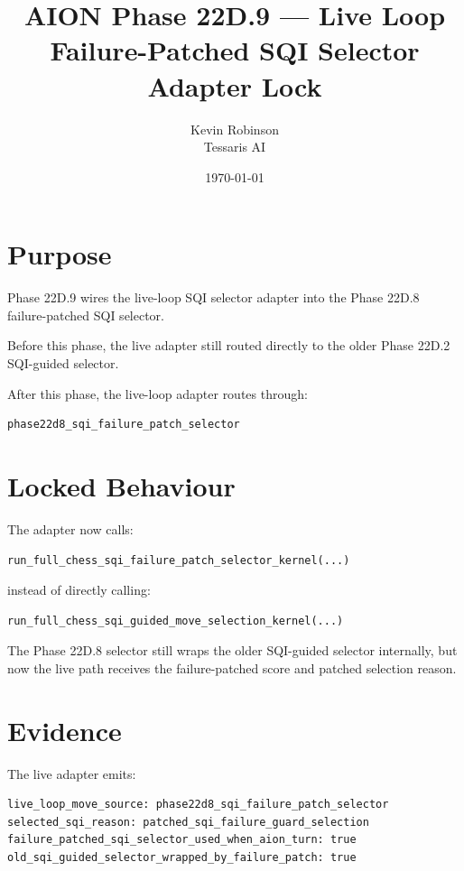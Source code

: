 \documentclass[11pt,a4paper]{article}
\title{\textbf{AION Phase 22D.9 --- Live Loop Failure-Patched SQI Selector Adapter Lock}}
\author{Kevin Robinson\\Tessaris AI}
\date{\today}
\begin{document}
\maketitle

\section{Purpose}

Phase 22D.9 wires the live-loop SQI selector adapter into the Phase 22D.8 failure-patched SQI selector.

Before this phase, the live adapter still routed directly to the older Phase 22D.2 SQI-guided selector.

After this phase, the live-loop adapter routes through:

\begin{verbatim}
phase22d8_sqi_failure_patch_selector
\end{verbatim}

\section{Locked Behaviour}

The adapter now calls:

\begin{verbatim}
run_full_chess_sqi_failure_patch_selector_kernel(...)
\end{verbatim}

instead of directly calling:

\begin{verbatim}
run_full_chess_sqi_guided_move_selection_kernel(...)
\end{verbatim}

The Phase 22D.8 selector still wraps the older SQI-guided selector internally, but now the live path receives the failure-patched score and patched selection reason.

\section{Evidence}

The live adapter emits:

\begin{verbatim}
live_loop_move_source: phase22d8_sqi_failure_patch_selector
selected_sqi_reason: patched_sqi_failure_guard_selection
failure_patched_sqi_selector_used_when_aion_turn: true
old_sqi_guided_selector_wrapped_by_failure_patch: true
\end{verbatim}
\end{document}
